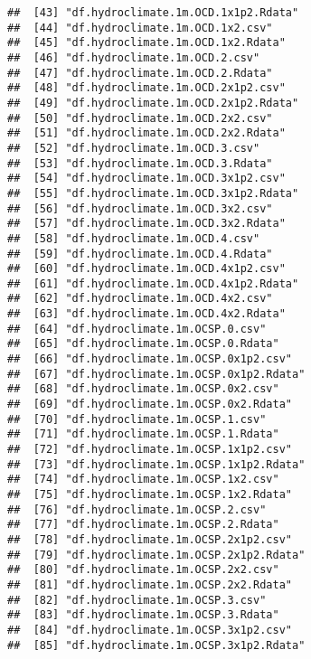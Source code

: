 \documentclass[
]{article}
\begin{document}
\begin{verbatim}
##  [43] "df.hydroclimate.1m.OCD.1x1p2.Rdata"               
##  [44] "df.hydroclimate.1m.OCD.1x2.csv"                   
##  [45] "df.hydroclimate.1m.OCD.1x2.Rdata"                 
##  [46] "df.hydroclimate.1m.OCD.2.csv"                     
##  [47] "df.hydroclimate.1m.OCD.2.Rdata"                   
##  [48] "df.hydroclimate.1m.OCD.2x1p2.csv"                 
##  [49] "df.hydroclimate.1m.OCD.2x1p2.Rdata"               
##  [50] "df.hydroclimate.1m.OCD.2x2.csv"                   
##  [51] "df.hydroclimate.1m.OCD.2x2.Rdata"                 
##  [52] "df.hydroclimate.1m.OCD.3.csv"                     
##  [53] "df.hydroclimate.1m.OCD.3.Rdata"                   
##  [54] "df.hydroclimate.1m.OCD.3x1p2.csv"                 
##  [55] "df.hydroclimate.1m.OCD.3x1p2.Rdata"               
##  [56] "df.hydroclimate.1m.OCD.3x2.csv"                   
##  [57] "df.hydroclimate.1m.OCD.3x2.Rdata"                 
##  [58] "df.hydroclimate.1m.OCD.4.csv"                     
##  [59] "df.hydroclimate.1m.OCD.4.Rdata"                   
##  [60] "df.hydroclimate.1m.OCD.4x1p2.csv"                 
##  [61] "df.hydroclimate.1m.OCD.4x1p2.Rdata"               
##  [62] "df.hydroclimate.1m.OCD.4x2.csv"                   
##  [63] "df.hydroclimate.1m.OCD.4x2.Rdata"                 
##  [64] "df.hydroclimate.1m.OCSP.0.csv"                    
##  [65] "df.hydroclimate.1m.OCSP.0.Rdata"                  
##  [66] "df.hydroclimate.1m.OCSP.0x1p2.csv"                
##  [67] "df.hydroclimate.1m.OCSP.0x1p2.Rdata"              
##  [68] "df.hydroclimate.1m.OCSP.0x2.csv"                  
##  [69] "df.hydroclimate.1m.OCSP.0x2.Rdata"                
##  [70] "df.hydroclimate.1m.OCSP.1.csv"                    
##  [71] "df.hydroclimate.1m.OCSP.1.Rdata"                  
##  [72] "df.hydroclimate.1m.OCSP.1x1p2.csv"                
##  [73] "df.hydroclimate.1m.OCSP.1x1p2.Rdata"              
##  [74] "df.hydroclimate.1m.OCSP.1x2.csv"                  
##  [75] "df.hydroclimate.1m.OCSP.1x2.Rdata"                
##  [76] "df.hydroclimate.1m.OCSP.2.csv"                    
##  [77] "df.hydroclimate.1m.OCSP.2.Rdata"                  
##  [78] "df.hydroclimate.1m.OCSP.2x1p2.csv"                
##  [79] "df.hydroclimate.1m.OCSP.2x1p2.Rdata"              
##  [80] "df.hydroclimate.1m.OCSP.2x2.csv"                  
##  [81] "df.hydroclimate.1m.OCSP.2x2.Rdata"                
##  [82] "df.hydroclimate.1m.OCSP.3.csv"                    
##  [83] "df.hydroclimate.1m.OCSP.3.Rdata"                  
##  [84] "df.hydroclimate.1m.OCSP.3x1p2.csv"                
##  [85] "df.hydroclimate.1m.OCSP.3x1p2.Rdata"              

\end{verbatim}
\end{document}
